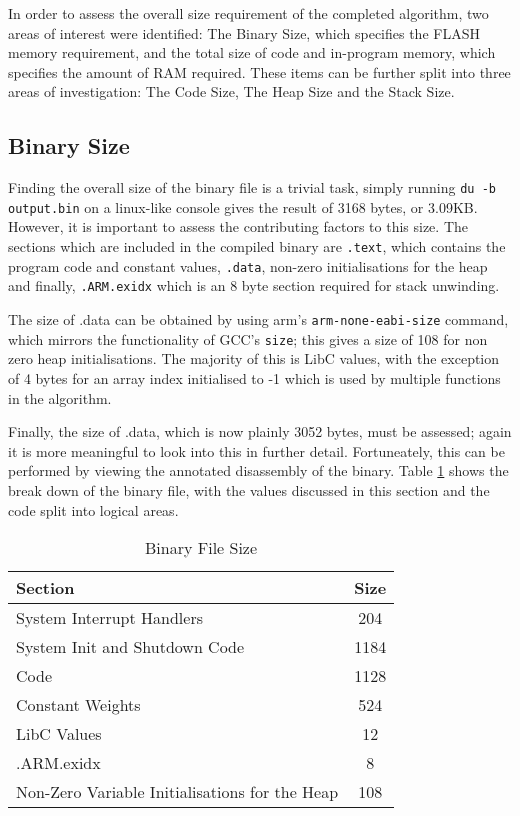 
In order to assess the overall size requirement of the completed algorithm, two areas of interest were identified: The Binary Size, which specifies the FLASH memory requirement, and the total size of code and in-program memory, which specifies the amount of RAM required. These items can be further split into three areas of investigation: The Code Size, The Heap Size and the Stack Size.

\subsection{Binary Size}

Finding the overall size of the binary file is a trivial task, simply running \verb|du -b output.bin| on a linux-like console gives the result of 3168 bytes, or 3.09KB. However, it is important to assess the contributing factors to this size. The sections which are included in the compiled binary are \verb|.text|, which contains the program code and constant values, \verb|.data|, non-zero initialisations for the heap and finally, \verb|.ARM.exidx| which is an 8 byte section required for stack unwinding.

The size of .data can be obtained by using arm's \verb|arm-none-eabi-size| command, which mirrors the functionality of GCC's \verb|size|; this gives a size of 108 for non zero heap initialisations. The majority of this is LibC values, with the exception of 4 bytes for an array index initialised to -1 which is used by multiple functions in the algorithm.

Finally, the size of .data, which is now plainly 3052 bytes, must be assessed; again it is more meaningful to look into this in further detail. Fortuneately, this can be performed by viewing the annotated disassembly of the binary. Table \ref{tab:prog-size} shows the break down of the binary file, with the values discussed in this section and the code split into logical areas.

\begin{table}[h]
    \centering
    \begin{tabular}{|l|c|}
        \hline
        Section & Size \\
        \hline
        System Interrupt Handlers & 204 \\
        System Init and Shutdown Code & 1184 \\
        Code & 1128 \\
        Constant Weights & 524 \\
        LibC Values & 12 \\
        .ARM.exidx & 8 \\
        Non-Zero Variable Initialisations for the Heap & 108 \\
        \hline
    \end{tabular}
    \caption{Binary File Size \label{tab:prog-size}}
\end{table}

